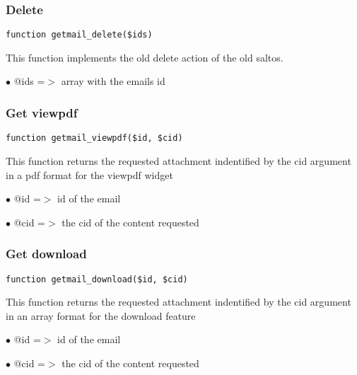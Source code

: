 \documentclass[a4paper]{article}
\begin{document}
\hypertarget{toc101}{}
\subsubsection{Delete}

\begin{lstlisting}
function getmail_delete($ids)
\end{lstlisting}

This function implements the old delete action of the old saltos.

\begin{compactitem}
\item[\color{myblue}$\bullet$] @ids =$>$ array with the emails id
\end{compactitem}

\hypertarget{toc102}{}
\subsubsection{Get viewpdf}

\begin{lstlisting}
function getmail_viewpdf($id, $cid)
\end{lstlisting}

This function returns the requested attachment indentified by the cid argument
in a pdf format for the viewpdf widget

\begin{compactitem}
\item[\color{myblue}$\bullet$] @id  =$>$ id of the email
\item[\color{myblue}$\bullet$] @cid =$>$ the cid of the content requested
\end{compactitem}

\hypertarget{toc103}{}
\subsubsection{Get download}

\begin{lstlisting}
function getmail_download($id, $cid)
\end{lstlisting}

This function returns the requested attachment indentified by the cid argument
in an array format for the download feature

\begin{compactitem}
\item[\color{myblue}$\bullet$] @id  =$>$ id of the email
\item[\color{myblue}$\bullet$] @cid =$>$ the cid of the content requested
\end{compactitem}
\end{document}
